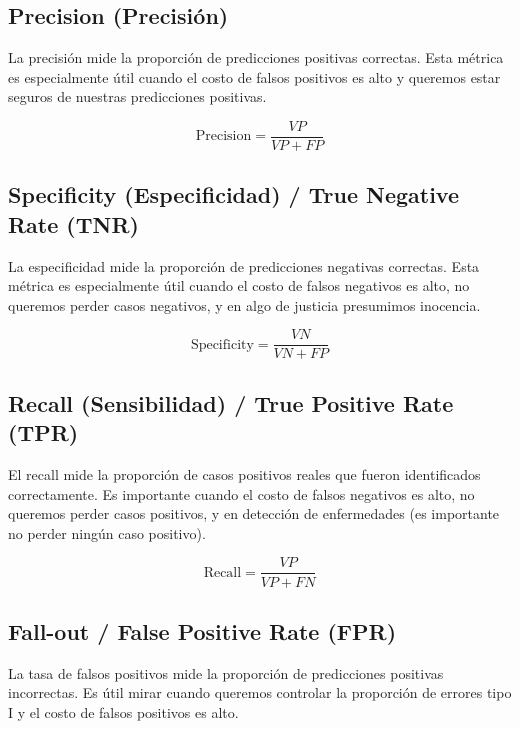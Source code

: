 \documentclass[12pt]{article}
\begin{document}
\vspace{0.3em}

\subsection{Precision (Precisión)}
La precisión mide la proporción de predicciones positivas correctas. Esta métrica es especialmente útil cuando el costo de falsos positivos es alto y queremos estar seguros de nuestras predicciones positivas.

\vspace{0.3em}

\[
\text{Precision} = \frac{VP}{VP + FP}
\]

\vspace{0.3em}

\subsection{Specificity (Especificidad) / True Negative Rate (TNR)}
La especificidad mide la proporción de predicciones negativas correctas. Esta métrica es especialmente útil cuando el costo de falsos negativos es alto, no queremos perder casos negativos, y en algo de justicia presumimos inocencia.

\vspace{0.3em}

\[
\text{Specificity} = \frac{VN}{VN + FP}
\]

\vspace{0.3em}

\subsection{Recall (Sensibilidad) / True Positive Rate (TPR)}
El recall mide la proporción de casos positivos reales que fueron identificados correctamente. Es importante cuando el costo de falsos negativos es alto, no queremos perder casos positivos, y en detección de enfermedades (es importante no perder ningún caso positivo).

\vspace{0.3em}

\[
\text{Recall} = \frac{VP}{VP + FN}
\]

\vspace{0.3em}

\subsection{Fall-out / False Positive Rate (FPR)}
La tasa de falsos positivos mide la proporción de predicciones positivas incorrectas. Es útil mirar cuando queremos controlar la proporción de errores tipo I y el costo de falsos positivos es alto.
\end{document}
